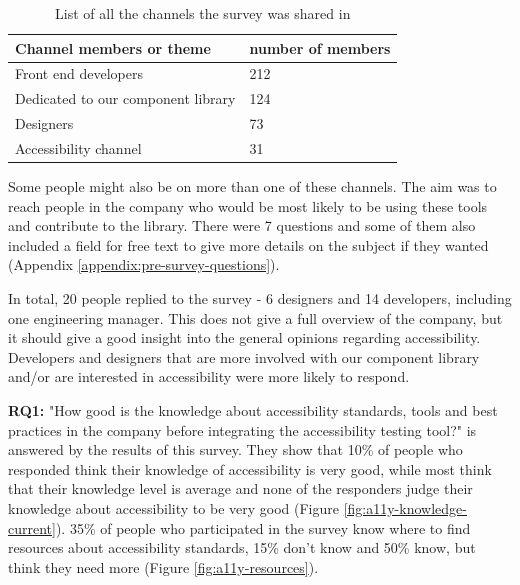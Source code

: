 \documentclass{master_thesis}
\begin{document}
\begin{table}[H]
	\centering
	\begin{tabular}{|l|l|}
		\hline
		\textbf{Channel members or theme} & \textbf{number of members}  \\
		\hline
		Front end developers  & 212  \\
		\hline
		Dedicated to our component library  & 124  \\
		\hline
		Designers  & 73  \\
		\hline
		Accessibility channel  & 31  \\
		\hline
	\end{tabular}
	\caption{List of all the channels the survey was shared in}
	\label{table:survey-shared}
\end{table}

Some people might also be on more than one of these channels. The aim was to reach people in the company who would be most likely to be using these tools and contribute to the library. There were 7 questions and some of them also included a field for free text to give more details on the subject if they wanted (Appendix \ref{appendix:pre-survey-questions}).

In total, 20 people replied to the survey - 6 designers and 14 developers, including one engineering manager. This does not give a full overview of the company, but it should give a good insight into the general opinions regarding accessibility. Developers and designers that are more involved with our component library and/or are interested in accessibility were more likely to respond.

\textbf{RQ1:} "How good is the knowledge about accessibility standards, tools and best practices in the company before integrating the accessibility testing tool?" is answered by the results of this survey. They show that 10\% of people who responded think their knowledge of accessibility is very good, while most think that their knowledge level is average and none of the responders judge their knowledge about accessibility to be very good (Figure \ref{fig:a11y-knowledge-current}). 35\% of people who participated in the survey know where to find resources about accessibility standards, 15\% don't know and 50\% know, but think they need more (Figure \ref{fig:a11y-resources}).
\end{document}
